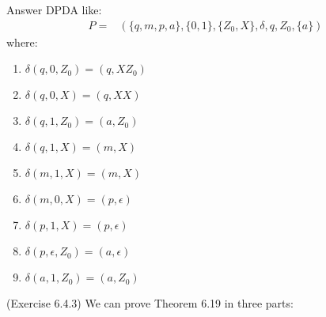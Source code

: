 \documentclass[10pt]{homework}
\begin{document}
\begin{solution}
    Answer DPDA like:
    \begin{align}
        P=&\left( \{q,m,p,a\},\{0,1\},\{Z_0,X\},\delta,q,Z_0,\{a\} \right) \nonumber
    \end{align}
    where:
    \begin{enumerate}
        \item $\delta\left( q,0,Z_0 \right) =\left( q,XZ_0 \right) $ 
        \item $\delta\left( q,0,X \right) =\left( q,XX \right) $ 
        \item $\delta\left( q,1,Z_0 \right) =\left( a,Z_0 \right) $
        \item $\delta\left( q,1,X \right) =\left( m,X \right) $
        \item $\delta\left( m,1,X \right) =\left( m,X \right) $ 
        \item $\delta\left( m,0,X \right)=\left( p,\epsilon \right)  $
        \item $\delta\left( p,1,X \right) =\left( p,\epsilon \right) $
        \item $\delta\left( p,\epsilon,Z_0 \right) =\left( a,\epsilon \right) $
        \item $\delta\left( a,1,Z_0 \right) =\left( a,Z_0 \right) $
    \end{enumerate}
\end{solution}

\begin{problem} (Exercise 6.4.3)
  We can prove Theorem 6.19 in three parts:
\end{problem}
\end{document}
